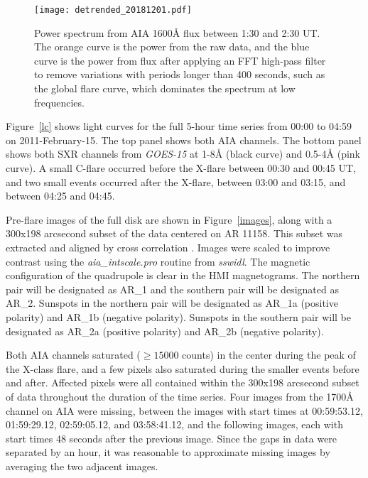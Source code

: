 
\begin{figure}[htb!]\centering
    \texttt{[image: detrended\_20181201.pdf]}
    \caption{%
        Power spectrum from
        AIA 1600\AA{} flux between 1:30 and 2:30 UT.
        The orange curve is the power from the raw data, and the blue
        curve is the power from flux after applying an FFT high-pass filter
        to remove variations with periods longer than 400 seconds,
        such as the global flare curve, which dominates the spectrum at
        low frequencies.
    \label{detrended2}}
\end{figure}


Figure~\ref{lc} shows light curves for the full 5-hour time series
from 00:00 to 04:59 on 2011-February-15.
The top panel shows both AIA channels.
The bottom panel shows both SXR channels from \textit{GOES-15} at
1-8\AA{} (black curve) and 0.5-4\AA{} (pink curve).
A small C-flare occurred before the X-flare between 00:30 and 00:45 UT, and
two small events occurred after the X-flare,
between 03:00 and 03:15, and between 04:25 and 04:45.


Pre-flare images of the full disk are shown in Figure~\ref{images},
along with a 300x198 arcsecond subset of the data centered on AR 11158.
{This subset was extracted and aligned by cross correlation}
\citep{McAteer2003,McAteer2004}.
Images were scaled to improve contrast using the
\textit{aia\_intscale.pro} routine from \textit{sswidl}.
The magnetic configuration of the quadrupole is clear in the HMI magnetograms.
The northern pair will be designated as AR\_1
and the southern pair will be designated as AR\_2.
Sunspots in the northern pair will be designated as AR\_1a (positive polarity)
and AR\_1b (negative polarity).
Sunspots in the southern pair will be designated as AR\_2a (positive polarity)
and AR\_2b (negative polarity).

Both AIA channels saturated ($\geq\!15000$ counts) in the center
during the peak of the X-class flare, and a few pixels also saturated
during the smaller events before and after.
Affected pixels were {all} contained within the
300x198 arcsecond {subset of data}
throughout the duration of the time series.
Four images from the 1700\AA{} channel on AIA were missing, between
the images with start times at
00:59:53.12,
01:59:29.12,
02:59:05.12, and
03:58:41.12, and the following images, each with start times
48 seconds after the previous image.
Since the gaps in data were separated by an hour,
it was reasonable to approximate {missing images}
by averaging the two adjacent images.

